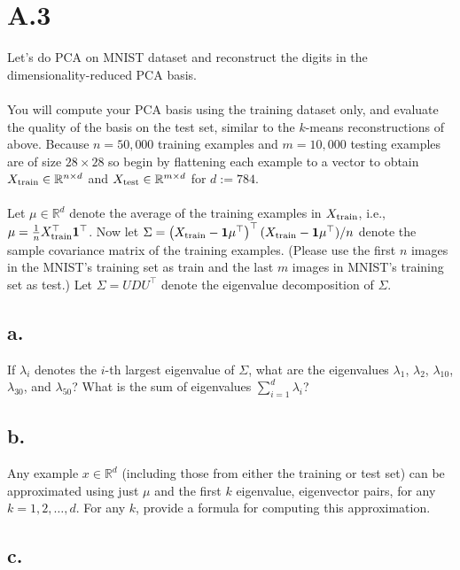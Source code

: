 \documentclass{article}
\newcommand{\1}{\mathbf{1}}
\begin{document}
\section*{A.3}
{\Large 

Let's do PCA on MNIST dataset and reconstruct the digits in the dimensionality-reduced PCA basis. \\ \\

You will compute your PCA basis using the training dataset only, and evaluate the quality of the basis on the test set, similar to the $k$-means reconstructions of above. Because $n = 50,000$ training examples and $m=10,000$ testing examples are of size $28 \times 28$ so begin by flattening each example to a vector to obtain $X_{\rm train} \in \mathbb{R}^{n \times d}$ and $X_{\rm test} \in \mathbb{R}^{m \times d}$ for $d := 784$. \\ \\

Let $\mu \in \mathbb{R}^{d}$ denote the average of the training examples in $X_{\rm train}$, i.e., $\mu = \frac{1}{n} X_{\rm train}^\top \mathbf{1}^\top$. Now let $\Sigma =  \left(X_{\rm train} - \mathbf{1} \mu^\top\right)^\top (X_{\rm train} - \mathbf{1} \mu^\top)/n$ denote the sample covariance matrix of the training examples. (Please use the first $n$ images in the MNIST's training set as train and the last $m$ images in MNIST's training set as test.) Let $\Sigma = UDU^\top$ denote the eigenvalue decomposition of $\Sigma$.

\subsection*{a.}

If $\lambda_i$ denotes the $i$-th largest eigenvalue of $\Sigma$, what are the eigenvalues $\lambda_1$, $\lambda_2$, $\lambda_{10}$, $\lambda_{30}$, and $\lambda_{50}$? What is the sum of eigenvalues $\sum_{i=1}^d{\lambda_i}$?

\subsection*{b.}

Any example $x \in \mathbb{R}^d$ (including those from either the training or test set) can be approximated using just $\mu$ and the first $k$ eigenvalue, eigenvector pairs, for any $k = 1, 2, \ldots, d$. For any $k$, provide a formula for computing this approximation.

\subsection*{c.}

}
\end{document}
